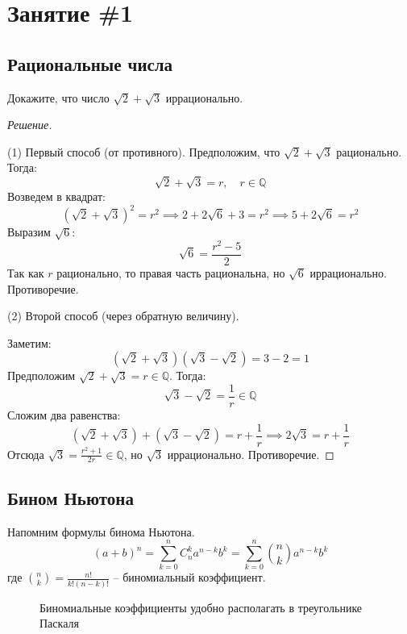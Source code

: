 \section{Занятие \#1}

\subsection{Рациональные числа}

\begin{problem}
 Докажите, что число \(\sqrt{2} + \sqrt{3}\) иррационально.
\end{problem}

\begin{proof}[Решение]~

(1) Первый способ (от противного). 
Предположим, что \(\sqrt{2} + \sqrt{3}\) рационально. Тогда:
\[
\sqrt{2} + \sqrt{3} = r, \quad r \in \mathbb{Q}
\]
Возведем в квадрат:
\[
(\sqrt{2} + \sqrt{3})^2 = r^2 \implies 2 + 2\sqrt{6} + 3 = r^2 \implies 5 + 2\sqrt{6} = r^2
\]
Выразим \(\sqrt{6}\):
\[
\sqrt{6} = \frac{r^2 - 5}{2}
\]
Так как \(r\) рационально, то правая часть рациональна, но \(\sqrt{6}\) иррационально. Противоречие.

(2) Второй способ (через обратную величину).

Заметим:
\[
(\sqrt{2} + \sqrt{3})(\sqrt{3} - \sqrt{2}) = 3 - 2 = 1
\]
Предположим \(\sqrt{2} + \sqrt{3} = r \in \mathbb{Q}\). Тогда:
\[
\sqrt{3} - \sqrt{2} = \frac{1}{r} \in \mathbb{Q}
\]
Сложим два равенства:
\[
(\sqrt{2} + \sqrt{3}) + (\sqrt{3} - \sqrt{2}) = r + \frac{1}{r} \implies 2\sqrt{3} = r + \frac{1}{r}
\]
Отсюда \(\sqrt{3} = \frac{r^2 + 1}{2r} \in \mathbb{Q}\), но \(\sqrt{3}\) иррационально. Противоречие.

\end{proof}

\subsection{Бином Ньютона}


Напомним формулы бинома Ньютона.
\[
(a + b)^n = \sum_{k=0}^{n} C_n^k a^{n-k} b^k = \sum_{k=0}^{n} \binom{n}{k} a^{n-k} b^k
\]
где \(\binom{n}{k} = \frac{n!}{k!(n-k)!}\) -- биномиальный коэффициент.


\begin{figure}[h!]
    \centering
    \caption{Биномиальные коэффициенты удобно располагать в треугольнике Паскаля}
\end{figure}


